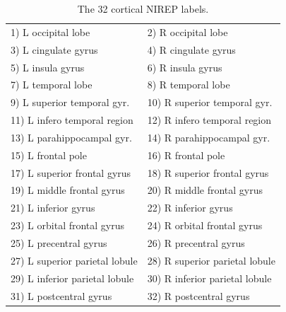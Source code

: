 
\begin{table}
\centering
\begin{tabular*}{0.45\textwidth}{@{\extracolsep{\fill}} l l}
\toprule
  1) L occipital lobe & 2) R occipital lobe \\
  3) L cingulate gyrus & 4) R cingulate gyrus \\
  5) L insula gyrus & 6) R insula gyrus \\
  7) L temporal lobe & 8) R temporal lobe \\
  9) L superior temporal gyr. & 10) R superior temporal gyr. \\
  11) L infero temporal region & 12) R infero temporal region \\
  13) L parahippocampal gyr. & 14) R parahippocampal gyr. \\
  15) L frontal pole & 16) R frontal pole \\
  17) L superior frontal gyrus & 18) R superior frontal gyrus \\
  19) L middle frontal gyrus & 20) R middle frontal gyrus \\
  21) L inferior gyrus & 22) R inferior gyrus \\
  23) L orbital frontal gyrus & 24) R orbital frontal gyrus \\
  25) L precentral gyrus & 26) R precentral gyrus \\
  27) L superior parietal lobule & 28) R superior parietal lobule \\
  29) L inferior parietal lobule & 30) R inferior parietal lobule \\
  31) L postcentral gyrus & 32)   R postcentral gyrus \\  
\bottomrule
\end{tabular*}
\caption{The 32 cortical NIREP labels.}
\label{table:nirep_labels}
\end{table}

